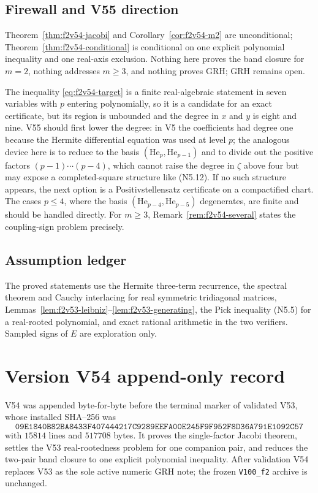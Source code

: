 \documentclass[11pt]{article}
\theoremstyle{definition}
\theoremstyle{remark}
\begin{document}
\subsection*{Firewall and V55 direction}
\label{fire:f2v54}
Theorem~\ref{thm:f2v54-jacobi} and Corollary~\ref{cor:f2v54-m2} are
unconditional; Theorem~\ref{thm:f2v54-conditional} is conditional on
one explicit polynomial inequality and one real-axis exclusion.  Nothing
here proves the band closure for \(m=2\), nothing addresses \(m\ge3\),
and nothing proves GRH; GRH remains open.

The inequality \eqref{eq:f2v54-target} is a finite real-algebraic
statement in seven variables with \(p\) entering polynomially, so it is a
candidate for an exact certificate, but its region is unbounded and the
degree in \(x\) and \(y\) is eight and nine.  V55 should first lower the
degree: in V5 the coefficients had degree one because the Hermite
differential equation was used at level \(p\); the analogous device here
is to reduce to the basis \((\mathrm{He}_p,\mathrm{He}_{p-1})\) and to
divide out the positive factors \((p-1)\cdots(p-4)\), which cannot raise
the degree in \(\zeta\) above four but may expose a completed-square
structure like \textup{(N5.12)}.  If no such structure appears, the
next option is a Positivstellensatz certificate on a compactified chart.
The cases \(p\le4\), where the basis \((\mathrm{He}_{p-4},\mathrm{He}_{p-5})\)
degenerates, are finite and should be handled directly.  For \(m\ge3\),
Remark~\ref{rem:f2v54-several} states the coupling-sign problem
precisely.

\subsection*{Assumption ledger}
\label{ass:f2v54}
The proved statements use the Hermite three-term recurrence, the
spectral theorem and Cauchy interlacing for real symmetric tridiagonal
matrices, Lemmas~\ref{lem:f2v53-leibniz}--\ref{lem:f2v53-generating},
the Pick inequality \textup{(N5.5)} for a real-rooted polynomial, and
exact rational arithmetic in the two verifiers.  Sampled signs of \(E\)
are exploration only.
\endgroup

\section*{Version V54 append-only record}

V54 was appended byte-for-byte before the terminal marker of validated
V53, whose installed SHA--256 was
\[
 \texttt{09E1840B82BA8433F407444217C9289E}
 \allowbreak\texttt{EFA00E245F9F952F8D36A791E1092C57}
\]
with \(15814\) lines and \(517708\) bytes.  It proves the single-factor
Jacobi theorem, settles the V53 real-rootedness problem for one
companion pair, and reduces the two-pair band closure to one explicit
polynomial inequality.  After validation V54 replaces V53 as the sole
active numeric GRH note; the frozen \texttt{V100\_f2} archive is
unchanged.
\end{document}
